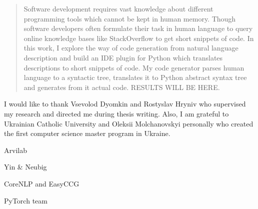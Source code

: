 \documentclass[
12pt, %
oneside, %
english, %
onehalfspacing, %
nolistspacing, %
liststotoc, %
parskip, %
headsepline, %
]{MastersDoctoralThesis} %
\begin{document}
\cleardoublepage




\begin{abstract}
\addchaptertocentry{\abstractname} %
Software development requires vast knowledge about different programming tools which cannot be kept in human memory. Though software developers often formulate their task in human language to query online knowledge bases like StackOverflow to get short snippets of code. In this work, I explore the way of code generation from natural language description and build an IDE plugin for Python which translates descriptions to short snippets of code. My code generator parses human language to a syntactic tree, translates it to Python abstract syntax tree and generates from it actual code. RESULTS WILL BE HERE.
\end{abstract}


\begin{acknowledgements}
\addchaptertocentry{\acknowledgementname} %
I would like to thank Vsevolod Dyomkin and Rostyslav Hryniv who supervised my research and directed me during thesis writing. Also, I am grateful to Ukrainian Catholic University and Oleksii  Molchanovskyi personally who created the first computer science master program in Ukraine. 

Arvilab

Yin & Neubig

CoreNLP and EasyCCG

PyTorch team
\end{acknowledgements}


\tableofcontents %
\end{document}
